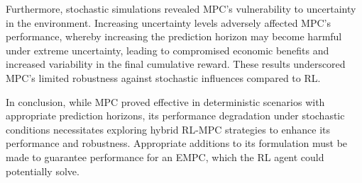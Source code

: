 Furthermore, stochastic simulations revealed MPC’s vulnerability to uncertainty in the environment. Increasing uncertainty levels adversely affected MPC’s performance, whereby increasing the prediction horizon may become harmful under extreme uncertainty, leading to compromised economic benefits and increased variability in the final cumulative reward. These results underscored MPC’s limited robustness against stochastic influences compared to RL.

In conclusion, while MPC proved effective in deterministic scenarios with appropriate prediction horizons, its performance degradation under stochastic conditions necessitates exploring hybrid RL-MPC strategies to enhance its performance and robustness. Appropriate additions to its formulation must be made to guarantee performance for an EMPC, which the RL agent could potentially solve. 
